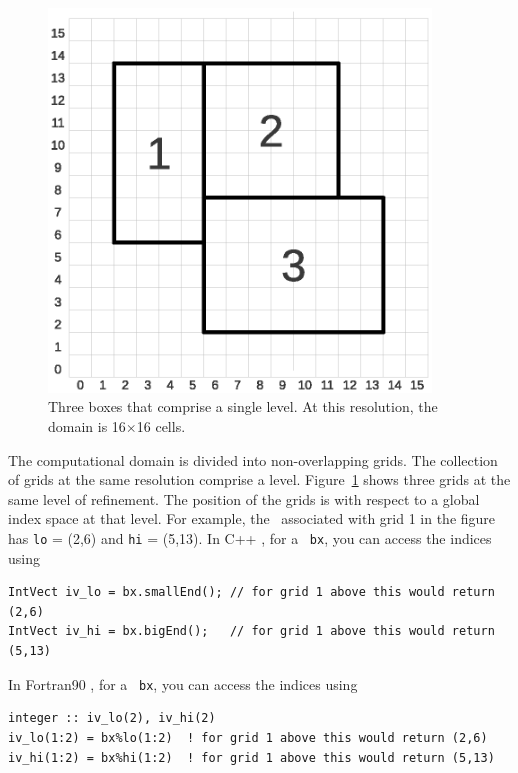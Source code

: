 \begin{figure}[tb]
\centering
\includegraphics[width=4.0in]{./Introduction/index_grid2}
\caption{\label{fig:boxes} Three boxes that comprise a single level.
At this resolution, the domain is 16$\times$16 cells.}
\end{figure}
The computational domain is divided into non-overlapping grids.  The collection of
grids at the same resolution comprise a level.
Figure~\ref{fig:boxes} shows three grids at the same level of
refinement.  The position of the grids is with respect to a global
index space at that level.  For example, the \BoxType\ associated with grid 1 
in the figure has {\tt lo} = (2,6) and {\tt hi} = (5,13).  In C++ \BoxLib, for a 
\BoxType\ {\tt bx}, you can access the indices using
\begin{lstlisting}[language={[gnu]make},mathescape=false]
IntVect iv_lo = bx.smallEnd(); // for grid 1 above this would return (2,6)
IntVect iv_hi = bx.bigEnd();   // for grid 1 above this would return (5,13)
\end{lstlisting}
In Fortran90 \BoxLib, for a 
\BoxType\ {\tt bx}, you can access the indices using
\begin{lstlisting}[language={[gnu]make},mathescape=false]
integer :: iv_lo(2), iv_hi(2)
iv_lo(1:2) = bx%lo(1:2)  ! for grid 1 above this would return (2,6)
iv_hi(1:2) = bx%hi(1:2)  ! for grid 1 above this would return (5,13)
\end{lstlisting}

\subsection{\BoxArray}

